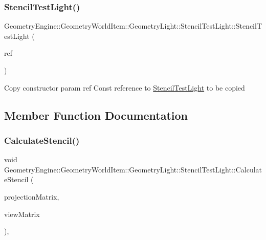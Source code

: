 \subsubsection{\texorpdfstring{StencilTestLight()}{StencilTestLight()}\hspace{0.1cm}{\footnotesize\ttfamily [2/2]}}
{\footnotesize\ttfamily Geometry\+Engine\+::\+Geometry\+World\+Item\+::\+Geometry\+Light\+::\+Stencil\+Test\+Light\+::\+Stencil\+Test\+Light (\begin{DoxyParamCaption}\item[{const \mbox{\hyperlink{class_geometry_engine_1_1_geometry_world_item_1_1_geometry_light_1_1_stencil_test_light}{Stencil\+Test\+Light}} \&}]{ref }\end{DoxyParamCaption})\hspace{0.3cm}{\ttfamily [inline]}}

Copy constructor param ref Const reference to \mbox{\hyperlink{class_geometry_engine_1_1_geometry_world_item_1_1_geometry_light_1_1_stencil_test_light}{Stencil\+Test\+Light}} to be copied 

\subsection{Member Function Documentation}
\mbox{\label{class_geometry_engine_1_1_geometry_world_item_1_1_geometry_light_1_1_stencil_test_light_aa1d9d4bf4f47e6e55dbb1706a7e28697}} 
\subsubsection{\texorpdfstring{CalculateStencil()}{CalculateStencil()}}
{\footnotesize\ttfamily void Geometry\+Engine\+::\+Geometry\+World\+Item\+::\+Geometry\+Light\+::\+Stencil\+Test\+Light\+::\+Calculate\+Stencil (\begin{DoxyParamCaption}\item[{const Q\+Matrix4x4 \&}]{projection\+Matrix,  }\item[{const Q\+Matrix4x4 \&}]{view\+Matrix }\end{DoxyParamCaption})\hspace{0.3cm}{\ttfamily [override]}, {\ttfamily [virtual]}}

